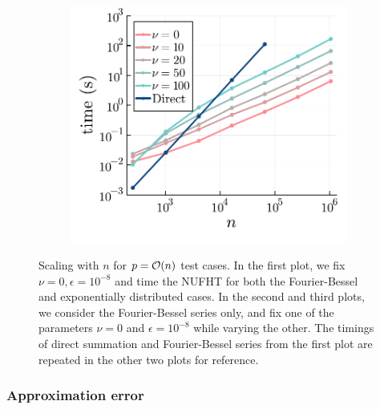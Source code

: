 \begin{figure}
\begin{subfigure}[b]{0.32\textwidth}
  \end{subfigure} 
  \begin{subfigure}[b]{0.32\textwidth}
    \includegraphics[height=0.92\textwidth, trim={1.3cm 0 0.4cm 0}, clip]{./figures/nu_scaling.pdf}
  \end{subfigure}
  \caption{Scaling with $n$ for $p = \mathcal{O}(n)$ test cases. In the first plot, we
  fix $\nu = 0, \epsilon = 10^{-8}$ and time the NUFHT for both the
  Fourier-Bessel and exponentially distributed cases. In the second and third
  plots, we consider the Fourier-Bessel series only, and fix one of the
  parameters $\nu = 0$ and $\epsilon = 10^{-8}$ while varying the other. The
  timings of direct summation and Fourier-Bessel series from the first plot are
  repeated in the other two plots for reference.}
  \label{fig:both-scaling}
\end{figure}

\subsubsection{Approximation error}

